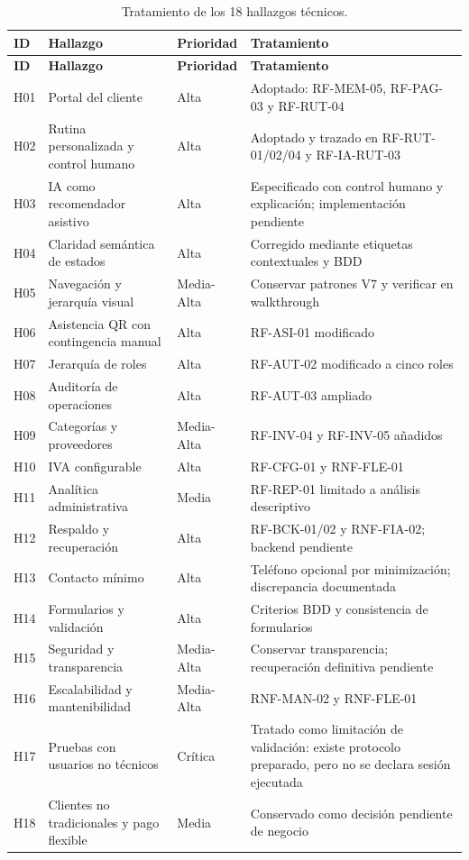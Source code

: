 \begin{longtable}{|p{1.3cm}|p{4.6cm}|p{2.1cm}|p{7cm}|}
\caption{Tratamiento de los 18 hallazgos técnicos.}\\\hline
\textbf{ID} & \textbf{Hallazgo} & \textbf{Prioridad} & \textbf{Tratamiento}\\\hline\endfirsthead
\hline\textbf{ID} & \textbf{Hallazgo} & \textbf{Prioridad} & \textbf{Tratamiento}\\\hline\endhead
H01 & Portal del cliente & Alta & Adoptado: RF-MEM-05, RF-PAG-03 y RF-RUT-04 \\ \hline
H02 & Rutina personalizada y control humano & Alta & Adoptado y trazado en RF-RUT-01/02/04 y RF-IA-RUT-03 \\ \hline
H03 & IA como recomendador asistivo & Alta & Especificado con control humano y explicación; implementación pendiente \\ \hline
H04 & Claridad semántica de estados & Alta & Corregido mediante etiquetas contextuales y BDD \\ \hline
H05 & Navegación y jerarquía visual & Media-Alta & Conservar patrones V7 y verificar en walkthrough \\ \hline
H06 & Asistencia QR con contingencia manual & Alta & RF-ASI-01 modificado \\ \hline
H07 & Jerarquía de roles & Alta & RF-AUT-02 modificado a cinco roles \\ \hline
H08 & Auditoría de operaciones & Alta & RF-AUT-03 ampliado \\ \hline
H09 & Categorías y proveedores & Media-Alta & RF-INV-04 y RF-INV-05 añadidos \\ \hline
H10 & IVA configurable & Alta & RF-CFG-01 y RNF-FLE-01 \\ \hline
H11 & Analítica administrativa & Media & RF-REP-01 limitado a análisis descriptivo \\ \hline
H12 & Respaldo y recuperación & Alta & RF-BCK-01/02 y RNF-FIA-02; backend pendiente \\ \hline
H13 & Contacto mínimo & Alta & Teléfono opcional por minimización; discrepancia documentada \\ \hline
H14 & Formularios y validación & Alta & Criterios BDD y consistencia de formularios \\ \hline
H15 & Seguridad y transparencia & Media-Alta & Conservar transparencia; recuperación definitiva pendiente \\ \hline
H16 & Escalabilidad y mantenibilidad & Media-Alta & RNF-MAN-02 y RNF-FLE-01 \\ \hline
H17 & Pruebas con usuarios no técnicos & Crítica & Tratado como limitación de validación: existe protocolo preparado, pero no se declara sesión ejecutada \\ \hline
H18 & Clientes no tradicionales y pago flexible & Media & Conservado como decisión pendiente de negocio \\ \hline
\end{longtable}

